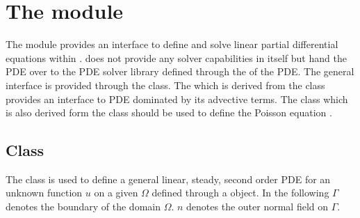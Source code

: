 
\chapter{The module \linearPDEsPack}

 
The module \linearPDEsPack provides an interface to define and solve linear partial 
differential equations within \escript. \linearPDEsPack does not provide any 
solver capabilities in itself but hand the PDE over to 
the PDE solver library defined through the \Domain of the PDE.
The general interface is provided through the \LinearPDE class. The
\AdvectivePDE which is derived from the \LinearPDE class
provides an interface to PDE dominated by its advective terms. The \Poisson
class which is also derived form the \LinearPDE class should be used
to define the Poisson equation .  

\section{\LinearPDE Class}
\label{SEC LinearPDE}

The \LinearPDE class is used to define a general linear, steady, second order PDE
for an unknown function $u$ on a given $\Omega$ defined through a \Domain object.
In the following $\Gamma$ denotes the boundary of the domain $\Omega$. $n$ denotes
the outer normal field on $\Gamma$. 

